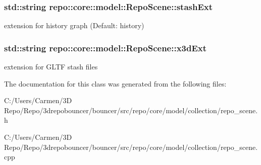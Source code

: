 \subsubsection[{stash\+Ext}]{\setlength{\rightskip}{0pt plus 5cm}std\+::string repo\+::core\+::model\+::\+Repo\+Scene\+::stash\+Ext\hspace{0.3cm}{\ttfamily [protected]}}\label{classrepo_1_1core_1_1model_1_1_repo_scene_a9e1ec4f9fa275647a75838361b3d2a5d}
extension for history graph (Default\+: history) \hypertarget{classrepo_1_1core_1_1model_1_1_repo_scene_ac55e20f143934e73afbca758b8d3d626}{}
\subsubsection[{x3d\+Ext}]{\setlength{\rightskip}{0pt plus 5cm}std\+::string repo\+::core\+::model\+::\+Repo\+Scene\+::x3d\+Ext\hspace{0.3cm}{\ttfamily [protected]}}\label{classrepo_1_1core_1_1model_1_1_repo_scene_ac55e20f143934e73afbca758b8d3d626}
extension for G\+L\+T\+F stash files 

The documentation for this class was generated from the following files\+:\begin{DoxyCompactItemize}
\item 
C\+:/\+Users/\+Carmen/3\+D Repo/\+Repo/3drepobouncer/bouncer/src/repo/core/model/collection/repo\+\_\+scene.\+h\item 
C\+:/\+Users/\+Carmen/3\+D Repo/\+Repo/3drepobouncer/bouncer/src/repo/core/model/collection/repo\+\_\+scene.\+cpp\end{DoxyCompactItemize}
